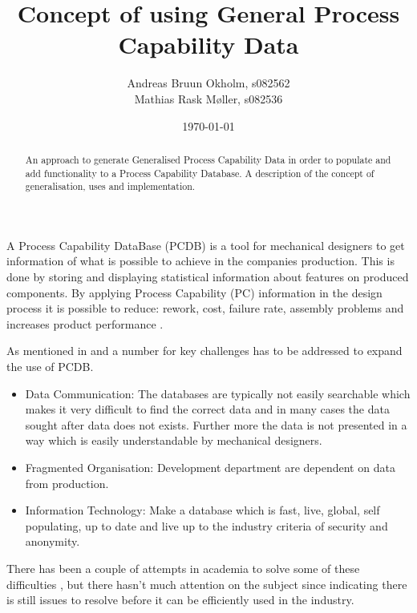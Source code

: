 \documentclass[aip,amsmath, reprint, author-year]{revtex4-1}
\begin{document}
\begin{abstract}
An approach to generate Generalised Process Capability Data in order to populate and add functionality to a Process Capability Database.
A description of the concept of generalisation, uses and implementation.
\end{abstract}

\title{Concept of using General Process Capability Data}
\author{Andreas Bruun Okholm, s082562\\
Mathias Rask Møller, s082536 }
 
\date{\today}
\maketitle


A Process Capability DataBase (PCDB) is a tool for mechanical designers to get information of what is possible to achieve in the companies production. This is done by storing and displaying statistical information about features on produced components.  
By applying Process Capability (PC) information in the design process it is possible to reduce: rework, cost, failure rate, assembly problems and increases product performance \citep{tata1999process}.

As mentioned in \citep{tata1999process, tata1999effective, raskokholm} and a number for key challenges has to be addressed to expand the use of PCDB.
\begin{itemize}
	\item Data Communication: The databases are typically not easily searchable which makes it very difficult to find the correct data and in many cases the data sought after data does not exists. Further more the data is not presented in a way which is easily understandable by mechanical designers.
	\item Fragmented Organisation: Development department are dependent on data from production. 
	\item Information Technology: Make a database which is fast, live, global, self populating, up to date and live up to the industry criteria of security and anonymity.
\end{itemize}

There has been a couple of attempts in academia to solve some of these difficulties \citep{thornton2000use, kern2003forecasting, thornton2004variation}, but there hasn't much attention on the subject since indicating there is still issues to resolve before it can be efficiently used in the industry.
\end{document}
